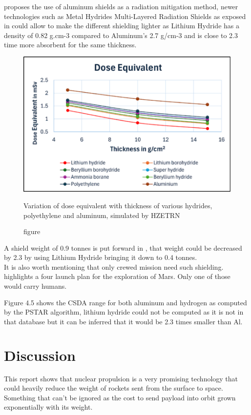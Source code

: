 \documentclass[12pt,a4paper]{report}
\begin{document}
\citet{hoffman1997} proposes the use of aluminum shields as a radiation mitigation method, newer technologies such as Metal Hydrides Multi-Layered Radiation Shields as exposed in \citet{sreedevi2025effectiveness} could allow to make the different shielding lighter as Lithium Hydride has a density of 0.82 g.cm-3 compared to Aluminum's 2.7 g/cm-3 and is close to 2.3 time more absorbent for the same thickness. \\
\begin{figure}[hbtp]
\centering
\includegraphics[width=.75\textwidth]{img/dose lih.png}
\caption{figure}{Variation of dose equivalent with thickness of various hydrides, polyethylene and aluminum, simulated by HZETRN}
\end{figure}



A shield weight of 0.9 tonnes is put forward in \citet{hoffman1997}, that weight could be decreased by 2.3 by using Lithium Hydride bringing it down to 0.4 tonnes.\\
It is also worth mentioning that only crewed mission need such shielding. \citet{hoffman1997} highlights a four launch plan for the exploration of Mars. Only one of those would carry humans.

Figure 4.5 shows the CSDA range for both aluminum and hydrogen as computed by the PSTAR algorithm, lithium hydride could not be computed as it is not in that database but it can be inferred that it would be 2.3 times smaller than Al.

\newpage



\chapter{Discussion}
\quad This report shows that nuclear propulsion is a very promising technology that could heavily reduce the weight of rockets sent from the surface to space. Something that can't be ignored as the cost to send payload into orbit grown exponentially with its weight.\\
\end{document}
